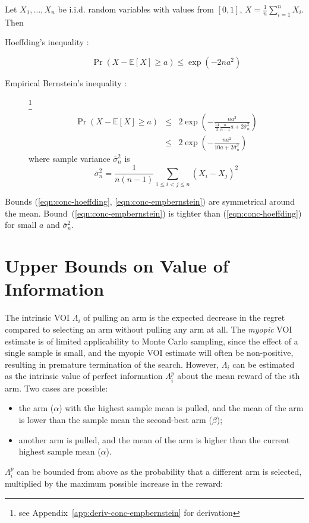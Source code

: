 \documentclass{article}
\newcommand {\IE} {\ensuremath {\mathbb{E}}}
\begin{document}
Let $X_1, \ldots, X_n$ be i.i.d. random variables with values from $[0,1]$,
$X=\frac 1 n \sum_{i=1}^n X_i$. Then 
\begin{description}
\item[Hoeffding's inequality \rm{\cite{Hoeffding.ineq}}:] 
\begin{equation}
\Pr(X-\IE[X] \ge a) \le \exp ( -2na^2)
\label{eqn:conc-hoeffding}
\end{equation}
\item[Empirical Bernstein's inequality
  \rm{\cite{MaurerPontil.benrstein}}:]\footnote{see
    Appendix~\ref{app:deriv-conc-empbernstein} for derivation}
\begin{eqnarray}
\Pr(X-\IE[X] \ge a) &\le& 2\exp \left( - \frac {na^2} {\frac {14} {3}
                          \frac {n} {n-1}a+2\overline\sigma_n^2}\right)\nonumber\\
                    &\le& 2\exp \left( - \frac {na^2} {10a+2\overline\sigma_n^2}\right)
\label{eqn:conc-empbernstein}
\end{eqnarray}
where sample variance $\overline\sigma_n^2$ is
\begin{equation}
\overline\sigma_n^2=\frac 1 {n(n-1)} \sum_{1\le i < j\le n}(X_i-X_j)^2
\label{eqn:sample-variance}
\end{equation}
\end{description}
Bounds (\ref{eqn:conc-hoeffding}, \ref{eqn:conc-empbernstein}) are symmetrical
around the mean. Bound~(\ref{eqn:conc-empbernstein}) is tighter than
(\ref{eqn:conc-hoeffding}) for small $a$ and $\overline\sigma_n^2$. 

\section{Upper Bounds on Value of Information}

The intrinsic VOI $\Lambda_i$ of pulling an arm is the expected decrease
in the regret compared to selecting an arm without pulling any arm at
all. The \textit{myopic} VOI estimate is of limited applicability to
Monte Carlo sampling, since the effect of a single sample is small,
and the myopic VOI estimate will often be non-positive, resulting in premature
termination of the search. However, $\Lambda_i$ can be estimated as the intrinsic 
value of perfect information $\Lambda_i^p$ about the mean reward of the $i$th arm. Two
cases are possible:
\begin{itemize}
\item the arm ($\alpha$) with the highest sample mean is pulled, and the 
mean of the arm is lower than the sample mean the second-best arm ($\beta$);
\item another arm is pulled, and the mean of the arm is higher
than the current highest sample mean ($\alpha$).
\end{itemize}
$\Lambda_i^p$ can be bounded from above as the probability that a
different arm is selected, multiplied by the
maximum possible increase in the reward:
\end{document}
